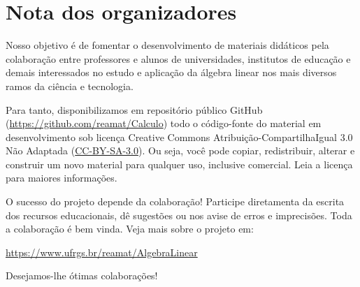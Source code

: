
\chapter*{Nota dos organizadores}

Nosso objetivo é de fomentar o desenvolvimento de materiais didáticos pela colaboração entre professores e alunos de universidades, institutos de educação e demais interessados no estudo e aplicação da álgebra linear nos mais diversos ramos da ciência e tecnologia.

Para tanto, disponibilizamos em repositório público GitHub (\url{https://github.com/reamat/Calculo}) todo o código-fonte do material em desenvolvimento sob licença Creative Commons Atribuição-CompartilhaIgual 3.0 Não Adaptada (\href{https://creativecommons.org/licenses/by-sa/3.0/}{CC-BY-SA-3.0}). Ou seja, você pode copiar, redistribuir, alterar e construir um novo material para qualquer uso, inclusive comercial. Leia a licença para maiores informações.

O sucesso do projeto depende da colaboração! Participe diretamenta da escrita dos recursos educacionais, dê sugestões ou nos avise de erros e imprecisões. Toda a colaboração é bem vinda. Veja mais sobre o projeto em:
\begin{center}
  \url{https://www.ufrgs.br/reamat/AlgebraLinear}
\end{center}

\vspace{0.5cm}

Desejamos-lhe ótimas colaborações!
